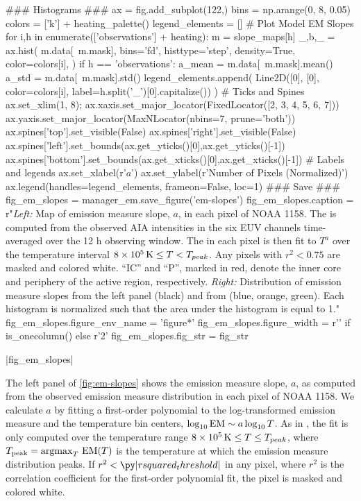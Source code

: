 \begin{pycode}[manager_em]
### Histograms ###
ax = fig.add_subplot(122,)
bins = np.arange(0, 8, 0.05)
colors = ['k'] + heating_palette()
legend_elements = []
# Plot Model EM Slopes
for i,h in enumerate(['observations'] + heating):
    m = slope_maps[h]
    _,b,_ = ax.hist(
        m.data[~m.mask],
        bins='fd',
        histtype='step',
        density=True,
        color=colors[i],
    )
    if h == 'observations':
        a_mean = m.data[~m.mask].mean()
        a_std = m.data[~m.mask].std()
    legend_elements.append(
        Line2D([0], [0], color=colors[i], label=h.split('_')[0].capitalize())
    )
# Ticks and Spines
ax.set_xlim(1, 8);
ax.xaxis.set_major_locator(FixedLocator([2, 3, 4, 5, 6, 7]))
ax.yaxis.set_major_locator(MaxNLocator(nbins=7, prune='both'))
ax.spines['top'].set_visible(False)
ax.spines['right'].set_visible(False)
ax.spines['left'].set_bounds(ax.get_yticks()[0],ax.get_yticks()[-1])
ax.spines['bottom'].set_bounds(ax.get_xticks()[0],ax.get_xticks()[-1])
# Labels and legends
ax.set_xlabel(r'$a$')
ax.set_ylabel(r'Number of Pixels (Normalized)')
ax.legend(handles=legend_elements, frameon=False, loc=1)
### Save ###
fig_em_slopes = manager_em.save_figure('em-slopes')
fig_em_slopes.caption = r"\textit{Left:} Map of emission measure slope, $a$, in each pixel of \AR{} NOAA 1158. The \dem{} is computed from the observed AIA intensities in the six EUV channels time-averaged over the 12 h observing window. The \dem{} in each pixel is then fit to $T^a$ over the temperature interval $8\times10^5\,\textup{K}\le T < T_{peak}$. Any pixels with $r^2<0.75$ are masked and colored white. ``IC'' and ``P'', marked in red, denote the inner core and periphery of the active region, respectively. \textit{Right:} Distribution of emission measure slopes from the left panel (black) and from  (blue, orange, green). Each histogram is normalized such that the area under the histogram is equal to 1."
fig_em_slopes.figure_env_name = 'figure*'
fig_em_slopes.figure_width = r'\columnwidth' if is_onecolumn() else r'2\columnwidth'
fig_em_slopes.fig_str = fig_str
\end{pycode}
\py[manager_em]|fig_em_slopes|

The left panel of \autoref{fig:em-slopes} shows the emission measure slope, $a$, as computed from the observed emission measure distribution in each pixel of \AR{} NOAA 1158.
We calculate $a$ by fitting a first-order polynomial to the log-transformed emission measure and the temperature bin centers, $\log_{10}\textup{EM}\sim a\log_{10}T$.
As in , the fit is only computed over the temperature range $8\times10^5\,\textup{K}\le T \le T_{peak}$, where $T_\textup{peak}=\operatorname*{argmax}_T\,\textup{EM}(T)$ is the temperature at which the emission measure distribution peaks.
If $r^2<\py|rsquared_threshold|$ in any pixel, where $r^2$ is the correlation coefficient for the first-order polynomial fit, the pixel is masked and colored white. 

